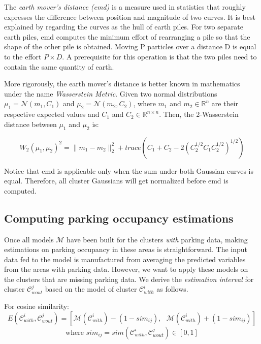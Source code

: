 \documentclass{ws-ijait}
\begin{document}
		The \textit{earth mover's distance (emd)} is a measure used in statistics that roughly expresses the difference between position and magnitude of two curves. It is best explained by regarding the curves as the hull of earth piles. For two separate earth piles, emd computes the minimum effort of rearranging a pile so that the shape of the other pile is obtained. Moving P particles over a distance D is equal to the effort $P \times D$. A prerequisite for this operation is that the two piles need to contain the same quantity of earth.
		
		More rigorously, the earth mover's distance is better known in mathematics under the name \textit{Wasserstein Metric}. Given two normal distributions $\mu_1=\mathcal{N}(m_1,C_1)$ and $\mu_2=\mathcal{N}(m_2,C_2)$, where $m_1$ and $m_2 \in \mathbb{R}^{n}$ are their respective expected values and $C_1$ and $C_2 \in \mathbb{R}^{n\times n}$. Then, the 2-Wasserstein distance between $\mu_1$ and $\mu_2$ is:
		
		\begin{equation}
		W_2(\mu_1,\mu_2)^2={\lVert}m_1-m_2{\rVert}^2_2+trace(C_1+C_2-2(C_2^{1/2}C_1C_2^{1/2})^{1/2})
		\end{equation}
		
		Notice that emd is applicable only when the sum under both Gaussian curves is equal. Therefore, all cluster Gaussians will get normalized before emd is computed.
		
		\subsection{Computing parking occupancy estimations}
		Once all models $\mathcal{M}$ have been built for the clusters \textit{with} parking data, making estimations on parking occupancy in these areas is straightforward. The input data fed to the model is manufactured from averaging the predicted variables from the areas with parking data. However, we want to apply these models on the clusters that are missing parking data. We derive the \textit{estimation interval} for cluster $\mathcal{C}_{wout}^j$ based on the model of cluster $\mathcal{C}_{with}^i$ as follows.
		
		For cosine similarity:
		\begin{equation}
		E(\mathcal{C}_{with}^i,\mathcal{C}_{wout}^j) = [\mathcal{M}(\mathcal{C}_{with}^i) - (1 - sim_{ij}), \text{    } \mathcal{M}(\mathcal{C}_{with}^i) + (1 - sim_{ij})]
		\end{equation}
		$$\text{where } sim_{ij} = sim(\mathcal{C}_{with}^i,\mathcal{C}_{wout}^j) \in [0,1]$$
		
\end{document}
